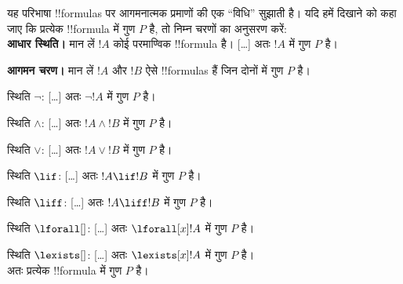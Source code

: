 \documentclass[../../include/open-logic-section]{subfiles}
\begin{document}
\begin{explain}
यह परिभाषा !!{formula}s पर आगमनात्मक प्रमाणों की एक ``विधि'' सुझाती है। यदि
हमें दिखाने को कहा जाए कि प्रत्येक !!{formula} में गुण $P$ है, तो निम्न चरणों
का अनुसरण करें:\\

\textbf{आधार स्थिति।} मान लें $!A$ कोई परमाण्विक !!{formula} है। [\ldots]
अतः $!A$ में गुण $P$ है।

\textbf{आगमन चरण।} मान लें $!A$ और $!B$ ऐसे !!{formula}s हैं जिन दोनों
में गुण $P$ है।

स्थिति $\lnot$: [\ldots] अतः $\lnot !A$ में गुण $P$ है।

स्थिति $\land$: [\ldots] अतः $!A \land !B$ में गुण $P$ है।

स्थिति $\lor$: [\ldots] अतः $!A \lor !B$ में गुण $P$ है।

स्थिति $\lif$: [\ldots] अतः $!A \lif !B$ में गुण $P$ है।

स्थिति $\liff$: [\ldots] अतः $!A \liff !B$ में गुण $P$ है।

स्थिति $\lforall[]$: [\ldots] अतः $\lforall[x] !A$ में गुण $P$ है।

स्थिति $\lexists[]$: [\ldots] अतः $\lexists[x] !A$ में गुण $P$ है। \\

अतः प्रत्येक !!{formula} में गुण $P$ है।
\end{explain}
\end{document}

